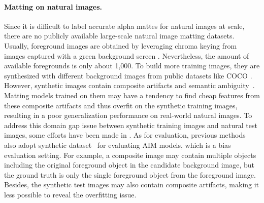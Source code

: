 \documentclass{article}
\begin{document}
\paragraph{Matting on natural images.}Since it is difficult to label accurate alpha mattes for natural images at scale, there are no publicly available large-scale natural image matting datasets. Usually, foreground images are obtained by leveraging chroma keying from images captured with a green background screen \cite{xu2017deep}. Nevertheless, the amount of available foregrounds is only about 1,000. To build more training images, they are synthesized with different background images from public datasets like COCO \cite{lin2014microsoft}. However, synthetic images contain composite artifacts and semantic ambiguity~\cite{gfm}. Matting models trained on them may have a tendency to find cheap features from these composite artifacts and thus overfit on the synthetic training images, resulting in a poor generalization performance on real-world natural images. To address this domain gap issue between synthetic training images and natural test images, some efforts have been made in \cite{gfm,hou2019context}. As for evaluation, previous methods~\cite{zhang2019late,Qiao_2020_CVPR} also adopt synthetic dataset~\cite{xu2017deep} for evaluating AIM models, which is a bias evaluation setting. For example, a composite image may contain multiple objects including the original foreground object in the candidate background image, but the ground truth is only the single foreground object from the foreground image. Besides, the synthetic test images may also contain composite artifacts, making it less possible to reveal the overfitting issue. 
\end{document}
